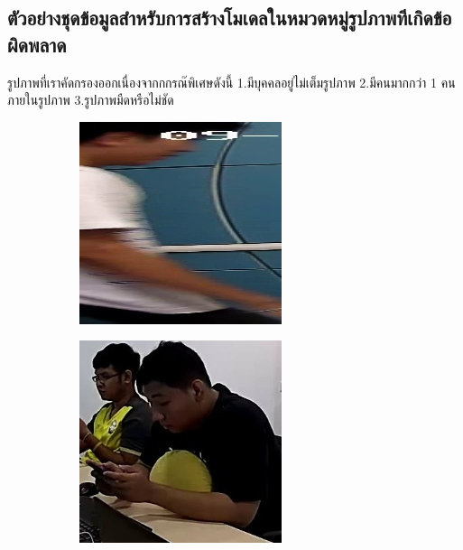 \clearpage
\subsection*{ตัวอย่างชุดข้อมูลสำหรับการสร้างโมเดลในหมวดหมู่รูปภาพทีเกิดข้อผิดพลาด}
รูปภาพที่เราคัดกรองออกเนื่องจากกกรณ๊พิเศษดังนี้ 1.มีบุคคลอยู่ไม่เต็มรูปภาพ 2.มีคนมากกว่า 1 คน ภายในรูปภาพ 3.รูปภาพมืดหรือไม่ชัด
\begin{figure}[!ht]
    \centering
    \begin{subfigure}[b]{0.45\linewidth}
      \includegraphics[width=\linewidth]{appendix/unknown/000_CXS0_D0_000149.jpg}
    \end{subfigure}
   \begin{subfigure}[b]{0.45\linewidth}
      \includegraphics[width=\linewidth]{appendix/unknown/000_CXS0_D0_001793.jpg}

\end{subfigure}
\end{figure}
